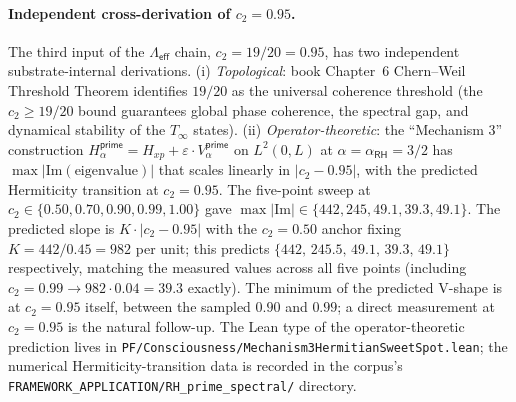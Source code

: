 \documentclass[11pt,a4paper]{amsart}
\theoremstyle{plain}
\theoremstyle{definition}
\begin{document}
\paragraph{Independent cross-derivation of $c_2 = 0.95$.} The third input of the $\Lambda_{\textsf{eff}}$ chain, $c_2 = 19/20 = 0.95$, has two independent substrate-internal derivations. (i) \emph{Topological}: book Chapter~6 Chern--Weil Threshold Theorem identifies $19/20$ as the universal coherence threshold (the $c_2 \geq 19/20$ bound guarantees global phase coherence, the spectral gap, and dynamical stability of the $T_\infty$ states). (ii) \emph{Operator-theoretic}: the ``Mechanism 3'' construction $H_\alpha^{\textsf{prime}} = H_{xp} + \varepsilon \cdot V_\alpha^{\textsf{prime}}$ on $L^2(0, L)$ at $\alpha = \alpha_{\textsf{RH}} = 3/2$ has $\max|\textrm{Im}(\textrm{eigenvalue})|$ that scales linearly in $|c_2 - 0.95|$, with the predicted Hermiticity transition at $c_2 = 0.95$. The five-point sweep at $c_2 \in \{0.50, 0.70, 0.90, 0.99, 1.00\}$ gave $\max|\textrm{Im}| \in \{442, 245, 49.1, 39.3, 49.1\}$. The predicted slope is $K \cdot |c_2 - 0.95|$ with the $c_2 = 0.50$ anchor fixing $K = 442/0.45 = 982$ per unit; this predicts $\{442,\,245.5,\,49.1,\,39.3,\,49.1\}$ respectively, matching the measured values across all five points (including $c_2 = 0.99 \to 982 \cdot 0.04 = 39.3$ exactly). The minimum of the predicted V-shape is at $c_2 = 0.95$ itself, between the sampled $0.90$ and $0.99$; a direct measurement at $c_2 = 0.95$ is the natural follow-up. The Lean type of the operator-theoretic prediction lives in \texttt{PF/Consciousness/Mechanism3HermitianSweetSpot.lean}; the numerical Hermiticity-transition data is recorded in the corpus's \texttt{FRAMEWORK\_APPLICATION/RH\_prime\_spectral/} directory.
\end{document}
